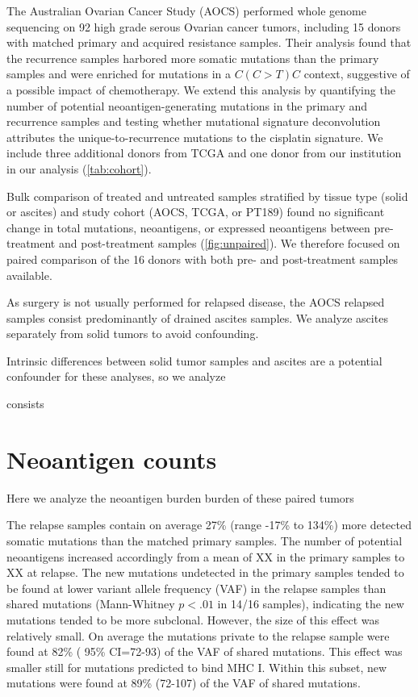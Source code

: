 The Australian Ovarian Cancer Study (AOCS)\cite{Patch_2015} performed whole genome sequencing on 92 high grade serous Ovarian cancer tumors, including 15 donors with matched primary and acquired resistance samples. Their analysis found that the recurrence samples harbored more somatic mutations than the primary samples and were enriched for mutations in a $C(C \gt T)C$ context, suggestive of a possible impact of chemotherapy. We extend this analysis by quantifying the number of potential neoantigen-generating mutations in the primary and recurrence samples and testing whether mutational signature deconvolution attributes the unique-to-recurrence mutations to the  cisplatin signature. We include three additional donors from TCGA and one donor from our institution in our analysis (\ref{tab:cohort}).

Bulk comparison of treated and untreated samples stratified by tissue type (solid or ascites) and study cohort (AOCS, TCGA, or PT189) found no significant change in total mutations, neoantigens, or expressed neoantigens between pre-treatment and post-treatment samples (\ref{fig:unpaired}). We therefore focused on paired comparison of the 16 donors with both pre- and post-treatment samples available. 

As surgery is not usually performed for relapsed disease, the AOCS relapsed samples consist predominantly of drained ascites samples. We analyze ascites separately from solid tumors to avoid confounding. 


Intrinsic differences between solid tumor samples and ascites are a potential confounder for these analyses, so we analyze 

consists 

\section*{Neoantigen counts}


Here we analyze the neoantigen burden burden of these paired tumors 

The relapse samples contain on average 27\% (range -17\% to 134\%) more detected somatic mutations than the matched primary samples. The number of potential neoantigens increased accordingly from a mean of XX in the primary samples to XX at relapse. The new mutations undetected in the primary samples tended to be found at lower variant allele frequency (VAF) in the relapse samples than shared mutations (Mann-Whitney $p \lt .01$ in 14/16 samples), indicating the new mutations tended to be more subclonal. However, the size of this effect was relatively small. On average the mutations private to the relapse sample were found at 82\% ( 95\% CI=72-93) of the VAF of shared mutations. This effect was smaller still for mutations predicted to bind MHC I. Within this subset, new mutations were found at 89\% (72-107) of the VAF of shared mutations.

